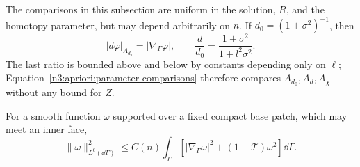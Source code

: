 The comparisons in this subsection are uniform in the solution,
$R$, and the homotopy parameter, but may depend arbitrarily on $n$.
If $d_0=(1+\sigma^2)^{-1}$, then
\[
 |d\varphi|_{A_{d_0}}=|\nabla_\Gamma\varphi|,
 \qquad
 \frac{d}{d_0}=\frac{1+\sigma^2}{1+l^2\sigma^2}.
\]
The last ratio is bounded above and below by constants depending
only on $\ell$; Equation~\eqref{n3:apriori:parameter-comparisons}
therefore compares $A_{d_0},A_d,A_\chi$ without any bound for $Z$.

\begin{lemma}
\label{n3:apriori:sobolev}
For a smooth function $\omega$ supported over a fixed compact base
patch, which may meet an inner face,
\begin{equation}
 \|\omega\|_{L^6(\dd\Gamma)}^2
 \le C(n)\int_\Gamma
       \left[|\nabla_\Gamma\omega|^2+
                            (1+\mathcal T)\omega^2\right]\dd\Gamma.
 \label{n3:apriori:sobolev-equation}
\end{equation}
\end{lemma}

